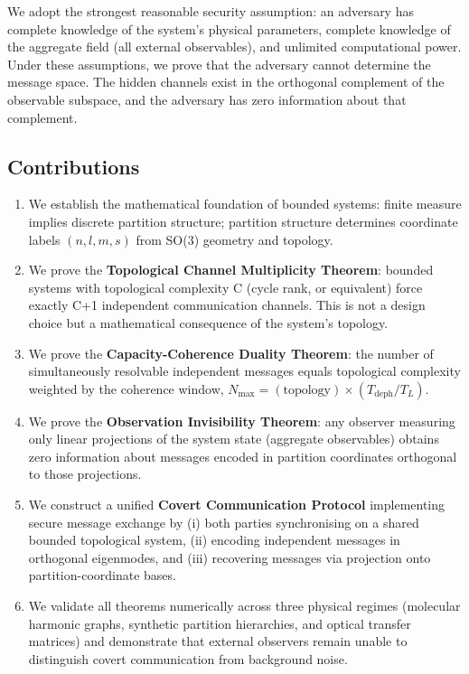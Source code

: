 \documentclass[11pt,twocolumn,a4paper]{article}
\theoremstyle{definition}
\begin{document}
We adopt the strongest reasonable security assumption: an adversary has complete knowledge of the system's physical parameters, complete knowledge of the aggregate field (all external observables), and unlimited computational power. Under these assumptions, we prove that the adversary cannot determine the message space. The hidden channels exist in the orthogonal complement of the observable subspace, and the adversary has zero information about that complement.

\subsection{Contributions}

\begin{enumerate}[nosep]
\item We establish the mathematical foundation of bounded systems: finite measure implies discrete partition structure; partition structure determines coordinate labels $(n,l,m,s)$ from SO(3) geometry and topology.

\item We prove the \textbf{Topological Channel Multiplicity Theorem}: bounded systems with topological complexity C (cycle rank, or equivalent) force exactly C+1 independent communication channels. This is not a design choice but a mathematical consequence of the system's topology.

\item We prove the \textbf{Capacity-Coherence Duality Theorem}: the number of simultaneously resolvable independent messages equals topological complexity weighted by the coherence window, $N_{\max} = (\text{topology}) \times (T_{\text{deph}}/T_L)$.

\item We prove the \textbf{Observation Invisibility Theorem}: any observer measuring only linear projections of the system state (aggregate observables) obtains zero information about messages encoded in partition coordinates orthogonal to those projections.

\item We construct a unified \textbf{Covert Communication Protocol} implementing secure message exchange by (i) both parties synchronising on a shared bounded topological system, (ii) encoding independent messages in orthogonal eigenmodes, and (iii) recovering messages via projection onto partition-coordinate bases.

\item We validate all theorems numerically across three physical regimes (molecular harmonic graphs, synthetic partition hierarchies, and optical transfer matrices) and demonstrate that external observers remain unable to distinguish covert communication from background noise.
\end{enumerate}
\end{document}
